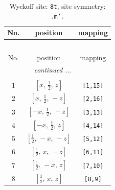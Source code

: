 \documentclass[fleqn,8pt]{jsarticle}
\begin{document}
\renewcommand{\arraystretch}{1.2}
\begin{longtable}{ccc}
\caption{Wyckoff site: {\tt 8t}, site symmetry: {\tt .m'.}}
 \\
 \hline \hline
No. & position & mapping \\ \hline \endfirsthead

\multicolumn{2}{l}{\tablename\ \thetable{}} \\
 \hline \hline
No. & position & mapping \\ \hline \endhead

 \hline \hline
\multicolumn{2}{r}{\footnotesize\it continued ...} \\ \endfoot

 \hline \hline
\multicolumn{2}{r}{} \\ \endlastfoot

1 & $\left[ x,\, \frac{1}{2},\, z \right]$ & {\tt [1,15]} \\ \hline
2 & $\left[ x,\, \frac{1}{2},\, - z \right]$ & {\tt [2,16]} \\ \hline
3 & $\left[ - x,\, \frac{1}{2},\, - z \right]$ & {\tt [3,13]} \\ \hline
4 & $\left[ - x,\, \frac{1}{2},\, z \right]$ & {\tt [4,14]} \\ \hline
5 & $\left[ \frac{1}{2},\, - x,\, - z \right]$ & {\tt [5,12]} \\ \hline
6 & $\left[ \frac{1}{2},\, x,\, - z \right]$ & {\tt [6,11]} \\ \hline
7 & $\left[ \frac{1}{2},\, - x,\, z \right]$ & {\tt [7,10]} \\ \hline
8 & $\left[ \frac{1}{2},\, x,\, z \right]$ & {\tt [8,9]} \\
\end{longtable}
\renewcommand{\arraystretch}{1.2}
\end{document}
